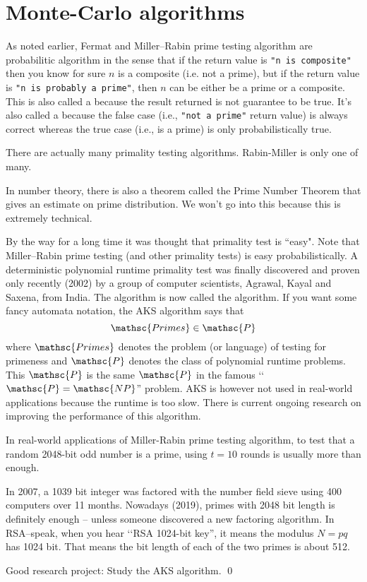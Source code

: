 \section{Monte-Carlo algorithms}

As noted earlier, Fermat and Miller--Rabin prime testing algorithm
are probabilitic algorithm in the sense that if the
return value is \verb!"n is composite"! then you know for sure $n$ is a
composite (i.e. not a prime), 
but if the return value is
\verb!"n is probably a prime"!,
then $n$ can be either be a prime or a
composite.
This is also called a
because the result returned is not guarantee to be true.
It's also called a  because the
false case (i.e., \verb!"not a prime"! return value) is always correct whereas the
true case (i.e., is a prime) is only probabilistically true.

There are actually many primality testing algorithms.
Rabin-Miller is only one of many.

In number theory, there is also a theorem called the Prime Number
Theorem that gives an estimate on prime distribution. We won't go
into this because this is extremely technical.

By the way for a long time it was thought that primality test is
``easy".
Note that Miller--Rabin prime testing (and other primality tests)
is easy probabilistically.
A deterministic polynomial runtime
primality test was finally discovered and proven only recently
(2002) by a group of computer scientists, Agrawal, Kayal and Saxena, from India.
The algorithm is now called the
algorithm.
If you want some fancy automata notation, the AKS algorithm
says that
\[
  \mathsc{Primes} \in \mathsc{P}
\]
where $\mathsc{Primes}$ denotes the problem (or language) of
testing for primeness and $\mathsc{P}$
denotes the class of polynomial runtime problems.
This $\mathsc{P}$ is the same $\mathsc{P}$ in the famous
\lq\lq$\mathsc{P} = \mathsc{NP}$'' problem.
AKS is however not used in real-world applications because the runtime
is too slow.
There is current ongoing research on improving the performance
of this algorithm.

In real-world applications of Miller-Rabin prime testing algorithm,
to test that a random 2048-bit odd number is a prime,
using $t = 10$ rounds is usually more than enough.

In 2007, a 1039 bit integer was factored with the number field sieve using
400 computers over 11 months.
Nowadays (2019), primes with 2048 bit length is definitely enough -- unless
someone discovered a new factoring algorithm.
In RSA--speak, when you hear \lq\lq RSA 1024-bit key'', it means
the modulus $N = pq$ has 1024 bit.
That means the bit length of each of the two primes is about 512.


\begin{ex}
  Good research project:
  Study the AKS algorithm.
  \qed
\end{ex}
